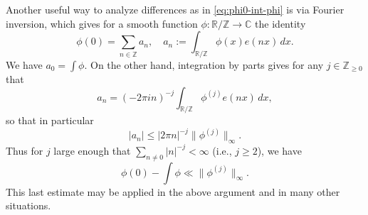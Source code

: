 \documentclass[reqno]{amsart} 
\begin{document}
\begin{remark}
  Another useful way to analyze differences as in \eqref{eq:phi0-int-phi} is via Fourier inversion, which gives for a smooth function $\phi : \mathbb{R} / \mathbb{Z} \rightarrow \mathbb{C}$ the identity
  \begin{equation}
    \phi(0) = \sum _{n \in \mathbb{Z} } a_n, \quad
    a_n := \int _{\mathbb{R}/\mathbb{Z}} \phi (x) e (n x ) \,d x.
  \end{equation}
  We have $a_0 = \int \phi$.  On the other hand, integration by parts gives for any $j \in \mathbb{Z}_{\geq 0}$ that
  \begin{equation}
    a_n = (-2 \pi i n)^{-j} \int _{\mathbb{R} / \mathbb{Z} } \phi^{(j)} e(n x) \, d x,
  \end{equation}
  so that in particular
  \begin{equation}
    |a_n| \leq |2 \pi n|^{-j} \|\phi^{(j)}\|_{\infty}.
  \end{equation}
  Thus for $j$ large enough that $\sum_{n \neq 0} |n|^{-j} < \infty$ (i.e., $j \geq 2$), we have
  \begin{equation}
    \phi (0) - \int \phi \ll \|\phi^{(j)}\|_{\infty}.
  \end{equation}
  This last estimate may be applied in the above argument and in many other situations.
\end{remark}
\end{document}
